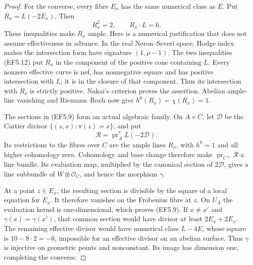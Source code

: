 \begin{proof}
For the converse, every fibre \(E_x\) has the same numerical
class as \(E\). Put \(R_x=L(-2E_x)\). Then
\[
                     R_x^2=2,\qquad R_x\cdot L=6.
 \tag{EF5.12}
\]
These inequalities make \(R_x\) ample. Here is a numerical
justification that does not assume effectiveness in advance.
In the real Neron--Severi space, Hodge index makes the intersection
form have signature \((1,\rho-1)\). The two inequalities
(EF5.12) put \(R_x\) in the component of the positive cone
containing \(L\). Every nonzero effective curve is nef, has
nonnegative square and has positive intersection with \(L\);
it is in the closure of that component. Thus its intersection
with \(R_x\) is strictly positive. Nakai's criterion proves
the assertion. Abelian ample-line vanishing and Riemann--Roch
now give \(h^0(R_x)=\chi(R_x)=1\).

The sections in (EF5.9) form an actual algebraic family. On
\(A\times C\), let \(\mathcal D\) be the Cartier divisor
\(\{(z,x):\pi(z)=x\}\), and put
\[
 \mathcal R=\operatorname{pr}_A^*L(-2\mathcal D).
\]
Its restrictions to the fibres over \(C\) are the ample lines
\(R_x\), with \(h^0=1\) and all higher cohomology zero.
Cohomology and base change therefore make
\(\operatorname{pr}_{C*}\mathcal R\) a line bundle.
Its evaluation map, multiplied by the canonical section of
\(2\mathcal D\), gives a line subbundle of
\(W\otimes\mathcal O_C\), and hence the morphism \(\gamma\).

At a point \(z\in E_x\), the resulting section is divisible
by the square of a local equation for \(E_x\). It therefore
vanishes on the Frobenius fibre at \(z\). On \(U_A\) the
evaluation kernel is one-dimensional, which proves (EF5.9).
If \(x\ne x'\) and \(\gamma(x)=\gamma(x')\), that common
section would have divisor at least \(2E_x+2E_{x'}\). The
remaining effective divisor would have numerical class
\(L-4E\), whose square is \(10-8\cdot2=-6\), impossible
for an effective divisor on an abelian surface. Thus \(\gamma\)
is injective on geometric points and nonconstant. Its image
has dimension one, completing the converse.
\end{proof}

